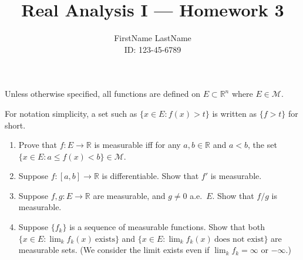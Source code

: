 \documentclass{article}
\title{Real Analysis I --- Homework 3}
\author{FirstName LastName \\ ID: 123-45-6789}
\date{}
\begin{document}
\maketitle

Unless otherwise specified, all functions are defined on $E \subset \mathbb{R}^{n}$ where $E \in \mathcal{M}$.
\bigskip

For notation simplicity, a set such as $\{x \in E: f(x) > t\}$ is written as $\{f>t\}$ for short.

\begin{enumerate}

\item Prove that $f: E \to \mathbb{R}$ is measurable iff for any $a,b \in \mathbb{R}$ and $a<b$, the set $\{x \in E: a \le f(x) < b\} \in \mathcal{M}$.




\item Suppose $f: [a,b] \to \mathbb{R}$ is differentiable. Show that $f'$ is measurable.




\item Suppose $f,g : E \to \mathbb{R}$ are measurable, and $g\ne 0$ a.e.~$E$. Show that $f/g$ is measurable.




\item Suppose $\{f_{k}\}$ is a sequence of measurable functions. Show that both $\{x\in E: \lim_{k} f_{k}(x)\ \mbox{exists}\}$ and $\{x\in E: \lim_{k} f_{k}(x)\ \mbox{does not exist}\}$ are measurable sets. (We consider the limit exists even if $\lim_{k}f_{k}=\infty$ or $-\infty$.)




\end{enumerate}
\end{document}
